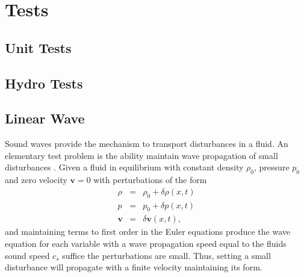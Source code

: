 \section{Tests}
\subsection{Unit Tests}

\subsection{Hydro Tests}
\subsection{Linear Wave}
Sound waves provide the mechanism to transport disturbances in a fluid. An
elementary test problem is the ability maintain wave propagation of small
disturbances . Given a fluid in equilibrium with constant density $\rho_0$,
pressure $p_0$ and zero velocity $\mathbf{v}=0$ with perturbations of the form
\begin{equation}
	\begin{array}{rcl}
		\rho & = & \rho_0 + \delta\rho(x,t) \\
   		 p & = & p_0 + \delta p(x,t) \\
    	\mathbf{v} & = & \delta\mathbf{v}(x,t),
    \end{array}
\end{equation}
and maintaining terms to first order in the Euler equations produce the wave
equation for each variable with a wave propagation speed equal to the fluids sound speed 
$c_s$ suffice the perturbations are small. Thus, setting a small disturbance will propagate 
with a finite velocity maintaining 
its form.

